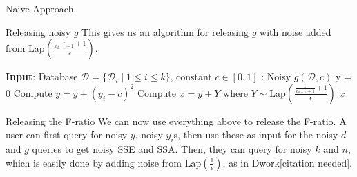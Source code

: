 \documentclass[11pt]{article}
\begin{document}
\begin{section}{Naive Approach}
\begin{subsection}{Releasing noisy $g$}
This gives us an algorithm for releasing $g$ with noise added from 
$\text{Lap}\left(\frac{\frac{1}{x_{k-1} + 1}+1}{\epsilon}\right)$.  

\begin{algorithm}
  \caption{}
  \label{alg-label}
  \begin{algorithmic}
    \STATE \textbf{Input}: Database $\mathcal{D} = \{\mathcal{D}_i \; |\; 
    1\leq i \leq k \}$, constant $c\in [0,1]$
    \STATE {}: Noisy $g(\mathcal{D},c)$
    \STATE y = 0
        \STATE Compute $y = y + (\overline{y}_i - c)^2$
      \ENDFOR
    \ENDFOR
    \STATE Compute $x = y + Y$ where 
     $Y\sim\text{Lap}\left(\frac{\frac{1}{x_{k-1} + 1}+1}{\epsilon}\right)$
    \RETURN $x$
  \end{algorithmic}
\end{algorithm}


\end{subsection}

\begin{subsection}{Releasing the F-ratio}
We can now use everything above to release the F-ratio. A user can first 
query for noisy $\overline{y}$, noisy $\overline{y}_i$s, then use these 
as input for the noisy $d$ and $g$ queries to get noisy SSE and SSA. 
Then, they can query for noisy $k$ and $n$, which is easily done by adding 
noise from $\text{Lap}(\frac{1}{\epsilon})$, as in Dwork[citation needed].
\end{subsection}

\end{section}
\end{document}

